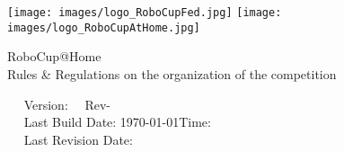\begin{titlepage}
  \begin{center}
    {
      \texttt{[image: images/logo\_RoboCupFed.jpg]}
      \hfill
      \texttt{[image: images/logo\_RoboCupAtHome.jpg]}\\[1.23ex]
    }
    \vspace{2.7 cm}
    \hrulefill\par
    {%
      \vspace*{.27cm}
      \Huge{RoboCup@Home}\\[1.23ex]
      \Large Rules \& Regulations on the organization of the competition \\[2ex]
    }
    \hrulefill\par
    \vfill
    ~~ Version: \YEAR ~~Rev-\svnRevision ~~ \\
    ~~ Last Build Date: \today \quad Time: \the\time ~~ \\
    ~~ Last Revision Date: \svnChangeData ~~ %
  \end{center}
\end{titlepage}

